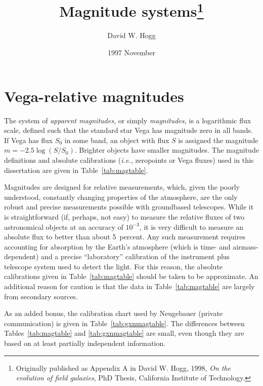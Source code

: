 

  \newcommand{\latin}[1]{\textit{#1}}
  \newcommand{\etal}{\latin{et~al}}
  \newcommand{\etc}{\latin{etc.}}
  \newcommand{\ie}{\latin{i.e.}}


\title{Magnitude systems\footnote{
Originally published as Appendix A in David W. Hogg, 1998, \textit{On
the evolution of field galaxies}, PhD Thesis, California Institute of
Technology.}}
\author{David W. Hogg}
\date{1997 November}
\maketitle

\section{Vega-relative magnitudes}

The system of {\em apparent magnitudes,\/} or simply {\em
magnitudes,\/} is a logarithmic flux scale, defined such that the
standard star Vega has magnitude zero in all bands.  If Vega has flux
$S_0$ in some band, an object with flux $S$ is assigned the magnitude
$m=-2.5\log(S/S_0)$.  Brighter objects have smaller magnitudes.  The
magnitude definitions and absolute calibrations (\ie, zeropoints or
Vega fluxes) used in this dissertation are given in
Table~\ref{tab:magtable}.

Magnitudes are designed for relative measurements, which, given the
poorly understood, constantly changing properties of the atmosphere,
are the only robust and precise measurements possible with groundbased
telescopes.  While it is straightforward (if, perhaps, not easy) to
measure the relative fluxes of two astronomical objects at an accuracy
of $10^{-3}$, it is very difficult to measure an absolute flux to
better than about 5~percent.  Any such measurement requires accounting
for absorption by the Earth's atmosphere (which is time- and
airmass-dependent) and a precise ``laboratory'' calibration of the
instrument plus telescope system used to detect the light.  For this
reason, the absolute calibrations given in Table~\ref{tab:magtable}
should be taken to be approximate.  An additional reason for caution
is that the data in Table~\ref{tab:magtable} are largely from
secondary sources.

As an added bonus, the calibration chart used by Neugebauer (private
communication) is given in Table~\ref{tab:gxnmagtable}.  The
differences between Tables~\ref{tab:magtable} and
\ref{tab:gxnmagtable} are small, even though they are
based on at least partially independent information.


